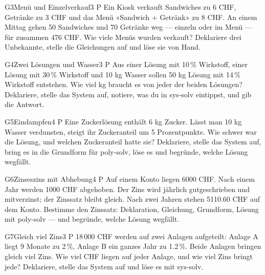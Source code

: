 \documentclass[11pt]{article}
\begin{document}
\begin{lpaufgabe}{G3}{Menü und Einzelverkauf}{3 P}
Ein Kiosk verkauft Sandwiches zu 6 CHF, Getränke zu 3 CHF und das Menü «Sandwich + Getränk» zu 8 CHF. An einem Mittag gehen
50 Sandwiches und 70 Getränke weg — einzeln oder im Menü — für zusammen 476 CHF. Wie viele Menüs wurden verkauft?
Deklariere drei Unbekannte, stelle die Gleichungen auf und löse sie von Hand.
\end{lpaufgabe}


\begin{lpaufgabe}{G4}{Zwei Lösungen und Wasser}{3 P}
Aus einer Lösung mit 10\,\% Wirkstoff, einer Lösung mit 30\,\% Wirkstoff und 10 kg Wasser sollen 50 kg Lösung mit 14\,\% Wirkstoff
entstehen. Wie viel kg braucht es von jeder der beiden Lösungen? Deklariere, stelle das System auf, notiere, was du in sys-solv eintippst,
und gib die Antwort.
\end{lpaufgabe}

\begin{lpaufgabe}{G5}{Eindampfen}{4 P}
Eine Zuckerlösung enthält 6 kg Zucker. Lässt man 10 kg Wasser verdunsten, steigt ihr Zuckeranteil um 5 Prozentpunkte.
Wie schwer war die Lösung, und welchen Zuckeranteil hatte sie? Deklariere, stelle das System auf, bring es in die Grundform
für poly-solv, löse es und begründe, welche Lösung wegfällt.
\end{lpaufgabe}

\begin{lpaufgabe}{G6}{Zinseszins mit Abhebung}{4 P}
Auf einem Konto liegen 6000 CHF. Nach einem Jahr werden 1000 CHF abgehoben. Der Zins wird jährlich gutgeschrieben und mitverzinst;
der Zinssatz bleibt gleich. Nach zwei Jahren stehen 5110.60 CHF auf dem Konto. Bestimme den Zinssatz: Deklaration, Gleichung,
Grundform, Lösung mit poly-solv — und begründe, welche Lösung wegfällt.
\end{lpaufgabe}

\begin{lpaufgabe}{G7}{Gleich viel Zins}{3 P}
18\,000 CHF werden auf zwei Anlagen aufgeteilt: Anlage A liegt 9 Monate zu 2\,\%, Anlage B ein ganzes Jahr zu 1.2\,\%.
Beide Anlagen bringen gleich viel Zins. Wie viel CHF liegen auf jeder Anlage, und wie viel Zins bringt jede?
Deklariere, stelle das System auf und löse es mit sys-solv.
\end{lpaufgabe}
\end{document}
